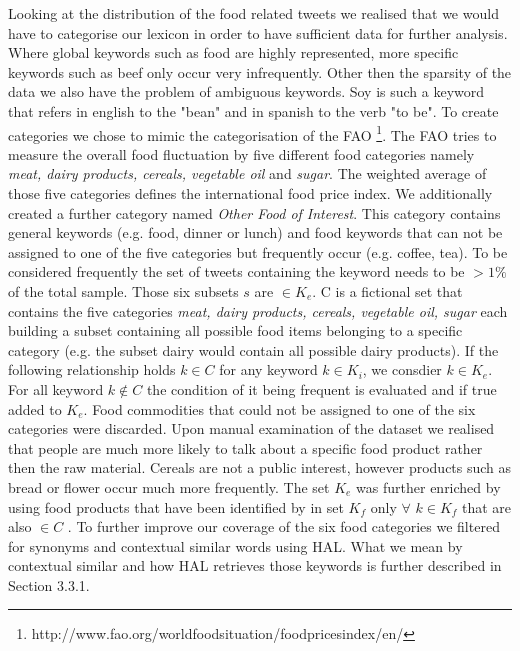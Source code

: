 \documentclass[12pt]{report}
\begin{document}
Looking at the distribution of the food related tweets we realised that we would have to categorise our lexicon in order to have sufficient data for further analysis. Where global keywords such as food are highly represented, more specific keywords such as beef only occur very infrequently. Other then the sparsity of the data we also have the problem of ambiguous keywords. Soy is such a keyword that refers in english to the "bean" and in spanish to the verb "to be". To create categories we chose to mimic the categorisation of the FAO  \footnote{http://www.fao.org/worldfoodsituation/foodpricesindex/en/}. The FAO tries to measure the overall food fluctuation by five different food categories namely \emph{meat, dairy products, cereals, vegetable oil} and \emph {sugar}. The weighted average of those five categories defines the international food price index. We additionally created a further category named \emph{Other Food of Interest}. This category contains general keywords (e.g. food, dinner or lunch) and food keywords that can not be assigned to one of the five categories but frequently occur (e.g. coffee, tea). To be considered frequently the set of tweets containing the keyword needs to be $> 1\%$ of the total sample. Those six subsets  $s$ are $\in K_e$. C is a fictional set that contains the five categories \emph{meat, dairy products, cereals, vegetable oil, sugar}  each building a subset containing all possible food items belonging to a specific category (e.g. the subset dairy would contain all possible dairy products). If the following relationship holds  $k \in C$ for any  keyword $k \in K_i$, we consdier $k \in K_e$. For all keyword $k \notin C$ the condition of it being frequent is evaluated and if true added to $K_e$.  Food commodities that could not be assigned to one of the six categories were discarded. Upon manual examination of the dataset we realised that people are much more likely to talk about a specific food product rather then the raw material. Cereals are not a public interest, however products such as bread or flower occur much more frequently. The set $K_e$  was further enriched by using food products that have been identified by \cite{AbbarMW14} in set $K_f$ only $\forall$ $k   \in K_f$ that are also $\in C$ . To further improve our coverage of the six food categories we filtered for synonyms and contextual similar words using HAL. What we mean by contextual similar and how HAL retrieves those keywords is further described in Section 3.3.1.
\end{document}
